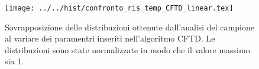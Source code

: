 \begin{figure}[h] \centering\texttt{[image: ../../hist/confronto\_ris\_temp\_CFTD\_linear.tex]}\caption{Sovrapposizione delle distribuzioni ottenute dall'analisi del campione al variare dei paramentri inseriti nell'algoritmo CFTD. Le distribuzioni sono state normalizzate in modo che il valore massimo sia 1.}\label{hist:confronto_ris_temp_CFTD_linear} \end{figure}
